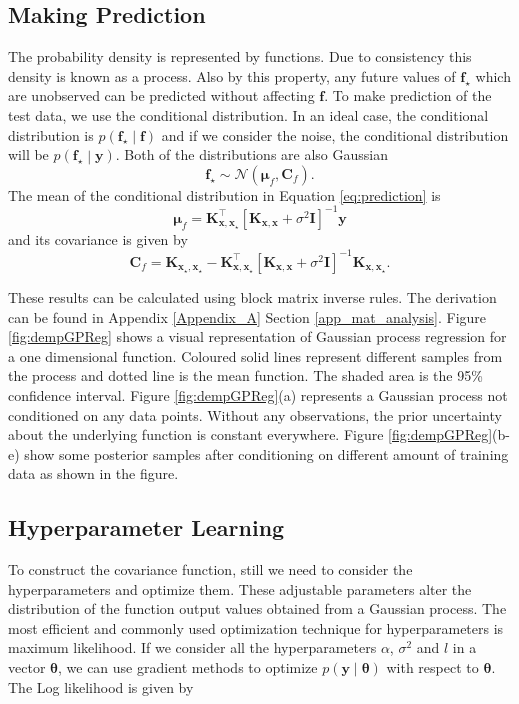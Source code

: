 \subsection{Making Prediction}
The probability density is represented by functions. Due to consistency this density is known as a process. Also by this property, any future values of $\mathbf{f_\star}$ which are unobserved can be predicted without affecting $\mathbf{f}$. To make prediction of the test data, we use the conditional distribution. In an ideal case, the conditional distribution is $p\left(\mathbf{f_\star}\middle| \mathbf{f} \right)$ and if we consider the noise, the conditional distribution will be $ p\left( \mathbf{f_\star} \middle| \mathbf{y} \right) $. Both of the distributions are also Gaussian
\begin{equation} \label{eq:prediction}
  \mathbf{f_\star}  \sim \mathcal{N} \left( \boldsymbol{\mu}_f, \mathbf{C}_f \right).
\end{equation}
The mean of the conditional distribution in Equation \ref{eq:prediction} is
\begin{equation} \label{eq:prediction_mean}
  \boldsymbol{\mu}_f = \mathbf{K_{x,x_\star}^\top} \left[ \mathbf{K_{x,x}}+ \sigma^2\mathbf{I} \right]^{-1} \mathbf{y}
\end{equation}
and its covariance is given by
\begin{equation} \label{eq:prediction_cov}
  \mathbf{C}_f = \mathbf{K_{x_\star,x_\star}} -
		\mathbf{K_{x,x_\star}^\top} \left[ \mathbf{K_{x,x}}+ \sigma^2\mathbf{I} \right]^{-1} \mathbf{K_{x,x_\star}}.
\end{equation}

These results can be calculated using block matrix inverse rules. The derivation can be found in Appendix \ref{Appendix_A} Section \ref{app_mat_analysis}. Figure \ref{fig:dempGPReg} shows a visual representation of Gaussian process regression for a one dimensional function. Coloured solid lines represent different samples from the process and dotted line is the mean function. The shaded area is the 95\% confidence interval. Figure \ref{fig:dempGPReg}(a) represents a Gaussian process not conditioned on any data points. Without any observations, the prior uncertainty about the underlying function is constant everywhere. Figure \ref{fig:dempGPReg}(b-e) show some posterior samples after conditioning on different amount of training data as shown in the figure. 

\subsection{Hyperparameter Learning}
To construct the covariance function, still we need to consider the hyperparameters and optimize them. These adjustable parameters alter the distribution of the function output values obtained from a Gaussian process. The most efficient and commonly used optimization technique for hyperparameters is maximum likelihood. If we consider all the hyperparameters $\alpha$, $\sigma^2$ and $l$ in a vector $\boldsymbol{\theta}$, we can use gradient methods to optimize $p \left(\mathbf{y}\middle|\boldsymbol{\theta}\right)$ with respect to $\boldsymbol{\theta}$. The Log likelihood is given by

